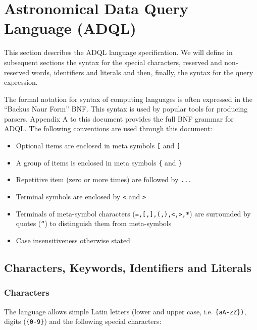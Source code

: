 \documentclass[11pt,a4paper]{ivoa}
\begin{document}
\section{Astronomical Data Query Language (ADQL)}

This section describes the ADQL language specification. We will define in
subsequent sections the syntax for the special characters, reserved and non-
reserved words, identifiers and literals and then, finally, the syntax for
the query expression.

The formal notation for syntax of computing languages is often expressed
in the “Backus Naur Form” BNF. This syntax is used by popular tools for
producing parsers. Appendix A to this document provides the full BNF grammar
for ADQL. The following conventions are used through this document:

\begin{itemize}
\item Optional items are enclosed in meta symbols \verb:[: and \verb:]:
\item A group of items is enclosed in meta symbols \verb:{: and \verb:}:
\item Repetitive item (zero or more times) are followed by \verb:...:
\item Terminal symbols are enclosed by \verb:<: and \verb:>:
\item Terminals of meta-symbol characters (\verb:=,[,],(,),<,>,*:) are surrounded by quotes (\verb:“:) to distinguish them from meta-symbols
\item Case insensitiveness otherwise stated
\end{itemize}

\subsection{Characters, Keywords, Identifiers and Literals}
\subsubsection{Characters}

The language allows simple Latin letters (lower and upper case, i.e.
\verb:{aA-zZ}):, digits (\verb:{0-9}:) and the following special characters:
\end{document}
